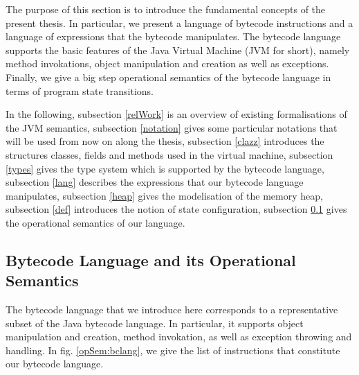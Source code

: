 \newtheorem{StateTransition}{Definition}[section]
\newtheorem{transClosStateTrans}[StateTransition]{Definition}


 The purpose of this section is to introduce the fundamental concepts of the
 present thesis. In particular, we present a language of bytecode instructions
 and a language of expressions that the bytecode manipulates.
 The bytecode language supports the basic features of the Java Virtual Machine \cite{VMSpec}(JVM for short),
 namely method invokations, object manipulation and creation as well as exceptions.
Finally, we give a big step operational semantics of the bytecode language in terms of program state transitions. 
 

 
 In the following,
 subsection \ref{relWork} is an overview of existing formalisations of the JVM semantics,
 subsection \ref{notation} gives some particular notations that will be used from now on along the thesis,
 subsection \ref{clazz} introduces the structures classes, fields and methods  used in the virtual machine, 
 subsection \ref{types} gives the type system which is supported by the bytecode language,
 subsection \ref{lang} describes the expressions that our bytecode language manipulates,
 subsection \ref{heap} gives the modelisation of the memory heap,
 subsection \ref{def} introduces the notion of state configuration,
 subsection \ref{opSem} gives the operational semantics of our language.

 
 
 
 
  
 
 

\subsection{Bytecode Language and its Operational Semantics} \label{opSem}
 The bytecode language that we introduce here corresponds to a representative subset of the Java bytecode language. 
 In particular, it supports object manipulation and creation, method invokation, as well as exception throwing and handling.
 In fig. \ref{opSem:bclang}, we give the list of instructions that constitute our bytecode
 language.
 
